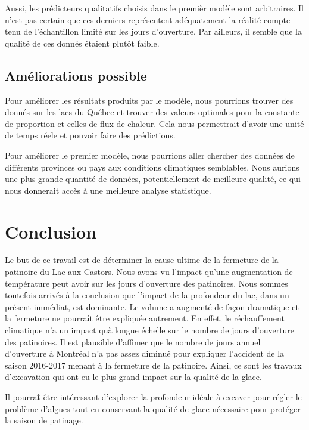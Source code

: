 \documentclass[12pt]{article}
\numberwithin{figure}{section}
\numberwithin{table}{section}
\begin{document}
Aussi, les pr\'edicteurs qualitatifs choisis dans le premi\`er mod\`ele sont arbitraires. Il n'est
pas certain que ces derniers repr\'esentent ad\'equatement la r\'ealit\'e compte tenu de
l'\'echantillon limit\'e sur les jours d'ouverture. Par ailleurs, il semble que la qualit\'e de ces
donn\'es \'etaient plut\^ot faible.

\subsection{Am\'eliorations possible}

Pour am\'eliorer les r\'esultats produits par le mod\`ele, nous pourrions trouver des donn\'es sur
les lacs du Qu\'ebec et trouver des valeurs optimales pour la constante de proportion et celles de
flux de chaleur. Cela nous permettrait d'avoir une unit\'e de temps r\'eele et pouvoir faire des
pr\'edictions.

Pour am\'eliorer le premier mod\`ele, nous pourrions aller chercher des donn\'ees de
diff\'erents provinces ou pays aux conditions climatiques semblables. Nous aurions une plus grande
quantit\'e de donn\'ees, potentiellement de meilleure qualit\'e, ce qui nous donnerait acc\`es \`a
une meilleure analyse statistique.

\section{Conclusion}

Le but de ce travail est de d\'eterminer la cause ultime de la fermeture de la patinoire du Lac aux
Castors. Nous avons vu l'impact qu'une augmentation de temp\'erature peut avoir sur les jours
d'ouverture des patinoires. Nous sommes toutefois arriv\'es \`a la conclusion que l'impact de la
profondeur du lac, dans un pr\'esent imm\'ediat, est dominante. Le volume a augment\'e de fa\c con
dramatique et la fermeture ne pourra\^it \^etre expliqu\'ee autrement. En effet, le r\'echauffement
climatique n'a un impact qu\`a longue \'echelle sur le nombre de jours d'ouverture des patinoires.
Il est plausible d'affimer que le nombre de jours annuel d'ouverture \`a Montr\'eal n'a pas assez
diminu\'e pour expliquer l'accident de la saison 2016-2017 menant \`a la fermeture de la patinoire.
Ainsi, ce sont les travaux d'excavation qui ont eu le plus grand impact sur la qualit\'e de la
glace.

Il pourra\^t \^etre int\'eressant d'explorer la profondeur id\'eale \`a excaver pour r\'egler le
probl\`eme d'algues tout en conservant la qualit\'e de glace n\'ecessaire pour prot\'eger la saison
de patinage.
\end{document}
